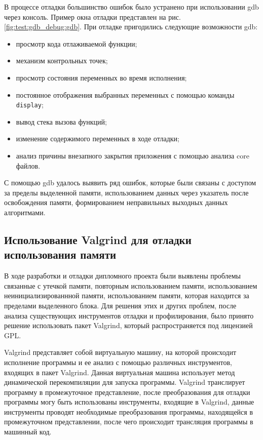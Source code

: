 В процессе отладки большинство ошибок было устранено при использовании gdb через консоль. Пример окна отладки
представлен на рис. \ref{fig:test:gdb_debug:gdb}. При отладке пригодились следующие возможности gdb:
\begin{itemize}
	\item просмотр кода отлаживаемой функции;
	\item механизм контрольных точек;
	\item просмотр состояния переменных во время исполнения;
	\item постоянное отображения выбранных переменных с помощью команды \texttt{display};
	\item вывод стека вызова функций;
	\item изменение содержимого переменных в ходе отладки;
	\item анализ причины внезапного закрытия приложения с помощью анализа core файлов.
\end{itemize}

С помощью gdb удалось выявить ряд ошибок, которые были связаны с доступом за пределы выделенной памяти, использованием
данных через указатель после освобождения памяти, формированием неправильных выходных данных алгоритмами.

\subsection{Использование Valgrind для отладки использования памяти}
\label{sec:test:valgrind}
В ходе разработки и отладки дипломного проекта были выявлены проблемы связанные с утечкой памяти, повторным
использованием памяти, использованием неинициализированнной памяти, использованием памяти, которая находится за
пределами выделенного блока. Для решения этих и других проблем, после анализа существующих инструментов отладки и
профилирования, было принято решение использовать пакет Valgrind, который распространяется под лицензией GPL.

Valgrind представляет собой виртуальную машину, на которой происходит исполнение программы и ее анализ с помощью
различных инструментов, входящих в пакет Valgrind. Данная виртуальная машина использует метод динамической
перекомпиляции для запуска программы. Valgrind транслирует программу в промежуточное представление, после преобразования
для отладки программы могу быть использованы инструменты, входящие в Valgrind, данные инструменты проводят необходимые
преобразования программы, находящейся в промежуточном представлении, после чего происходит трансляция программы в
машинный код.

